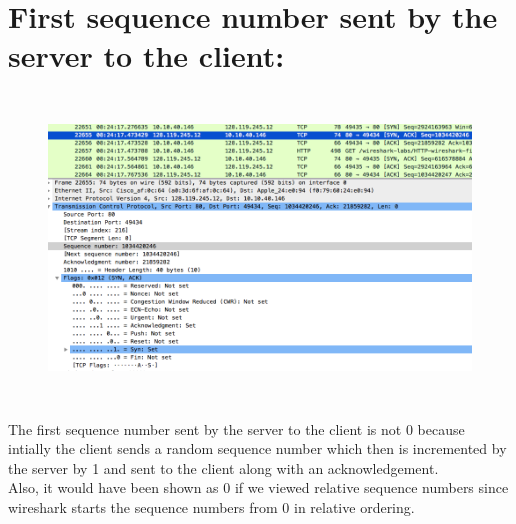 \documentclass[]{report}
\begin{document}
\section{First sequence number sent by the server to the client:}
\begin{figure}[H]
	\vspace{0pt}
	\includegraphics[height = 230pt, keepaspectratio]{Snapshots/q17.png}
\end{figure}
The first sequence number sent by the server to the client is not 0 because intially the client sends a random sequence number which then is incremented by the server by 1 and sent to the client along with an acknowledgement. \\ Also, it would have been shown as 0 if we viewed relative sequence numbers since wireshark starts the sequence numbers from 0 in relative ordering. 
\end{document}
